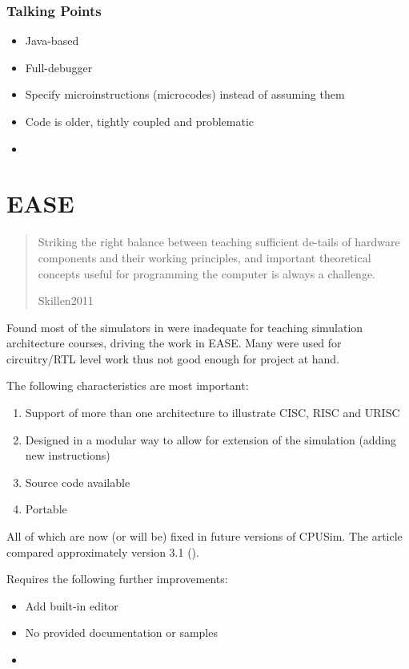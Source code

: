 \subsubsection{Talking Points}

\begin{itemize}
\item Java-based
\item Full-debugger
\item Specify microinstructions (microcodes) instead of assuming them
\item Code is older, tightly coupled and problematic
\item 
\end{itemize}

\section{EASE \cite{Skillen2011}}

\blockquote[Skillen2011]{Striking the right balance between teaching sufficient de-tails of hardware components and their working principles, and important theoretical concepts useful for programming the computer is always a challenge.}

Found most of the simulators in \cite{Nikolic2009} were inadequate for teaching simulation architecture courses, driving the work in EASE. Many were used for circuitry/RTL level work thus not good enough for project at hand. 

The following characteristics are most important: 

\begin{enumerate}
\item Support of more than one architecture to illustrate CISC, RISC and URISC
\item Designed in a modular way to allow for extension of the simulation (adding new instructions)
\item Source code available
\item Portable
\end{enumerate}

All of which are now (or will be) fixed in future versions of CPUSim. The article compared approximately version 3.1 (\cite{Skrien2001}). 

Requires the following further improvements: 

\begin{itemize}
\item Add built-in editor
\item No provided documentation or samples
\item 
\end{itemize}

